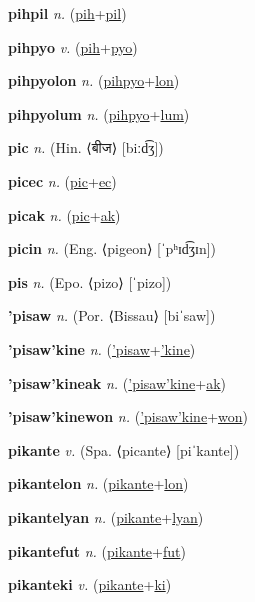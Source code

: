 \textbf{\hypertarget{pihpil}{pihpil}} \textit{n.} (\hyperlink{pih}{pih}+\allowbreak \hyperlink{pil}{pil})


\textbf{\hypertarget{pihpyo}{pihpyo}} \textit{v.} (\hyperlink{pih}{pih}+\allowbreak \hyperlink{pyo}{pyo})


\textbf{\hypertarget{pihpyolon}{pihpyolon}} \textit{n.} (\hyperlink{pihpyo}{pihpyo}+\allowbreak \hyperlink{lon}{lon})


\textbf{\hypertarget{pihpyolum}{pihpyolum}} \textit{n.} (\hyperlink{pihpyo}{pihpyo}+\allowbreak \hyperlink{lum}{lum})


\textbf{\hypertarget{pic}{pic}} \textit{n.} (Hin. ⟨{\devanagari{}बीज}⟩ [biːd͡ʒ])


\textbf{\hypertarget{picec}{picec}} \textit{n.} (\hyperlink{pic}{pic}+\allowbreak \hyperlink{ec}{ec})


\textbf{\hypertarget{picak}{picak}} \textit{n.} (\hyperlink{pic}{pic}+\allowbreak \hyperlink{ak}{ak})


\textbf{\hypertarget{picin}{picin}} \textit{n.} (Eng. ⟨pigeon⟩ [ˈpʰɪd͡ʒɪn])


\textbf{\hypertarget{pis}{pis}} \textit{n.} (Epo. ⟨pizo⟩ [ˈpizo])


\textbf{\hypertarget{'pisaw}{'pisaw}} \textit{n.} (Por. ⟨Bissau⟩ [biˈsaw])


\textbf{\hypertarget{'pisaw'kine}{'pisaw'kine}} \textit{n.} (\hyperlink{'pisaw}{'pisaw}+\allowbreak \hyperlink{'kine}{'kine})


\textbf{\hypertarget{'pisaw'kineak}{'pisaw'kineak}} \textit{n.} (\hyperlink{'pisaw'kine}{'pisaw'kine}+\allowbreak \hyperlink{ak}{ak})


\textbf{\hypertarget{'pisaw'kinewon}{'pisaw'kinewon}} \textit{n.} (\hyperlink{'pisaw'kine}{'pisaw'kine}+\allowbreak \hyperlink{won}{won})


\textbf{\hypertarget{pikante}{pikante}} \textit{v.} (Spa. ⟨picante⟩ [piˈkante])


\textbf{\hypertarget{pikantelon}{pikantelon}} \textit{n.} (\hyperlink{pikante}{pikante}+\allowbreak \hyperlink{lon}{lon})


\textbf{\hypertarget{pikantelyan}{pikantelyan}} \textit{n.} (\hyperlink{pikante}{pikante}+\allowbreak \hyperlink{lyan}{lyan})


\textbf{\hypertarget{pikantefut}{pikantefut}} \textit{n.} (\hyperlink{pikante}{pikante}+\allowbreak \hyperlink{fut}{fut})


\textbf{\hypertarget{pikanteki}{pikanteki}} \textit{v.} (\hyperlink{pikante}{pikante}+\allowbreak \hyperlink{ki}{ki})


